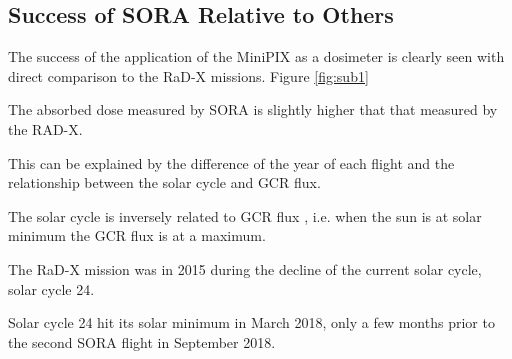 %



\subsection{Success of SORA Relative to Others}


The success of the application of the MiniPIX as a dosimeter is clearly seen with direct comparison to the RaD-X missions. Figure \ref{fig:sub1}

The absorbed dose measured by SORA is slightly higher that that measured by the RAD-X.

This can be explained by the difference of the year of each flight and the relationship between the solar cycle and GCR flux.

The solar cycle is inversely related to GCR flux \cite{hathaway}, i.e. when the sun is at solar minimum the GCR flux is at a maximum.

The RaD-X mission was in 2015 during the decline of the current solar cycle, solar cycle \num{24}. 

Solar cycle 24 hit its solar minimum in March 2018, only a few months prior to the second SORA flight in September 2018.







